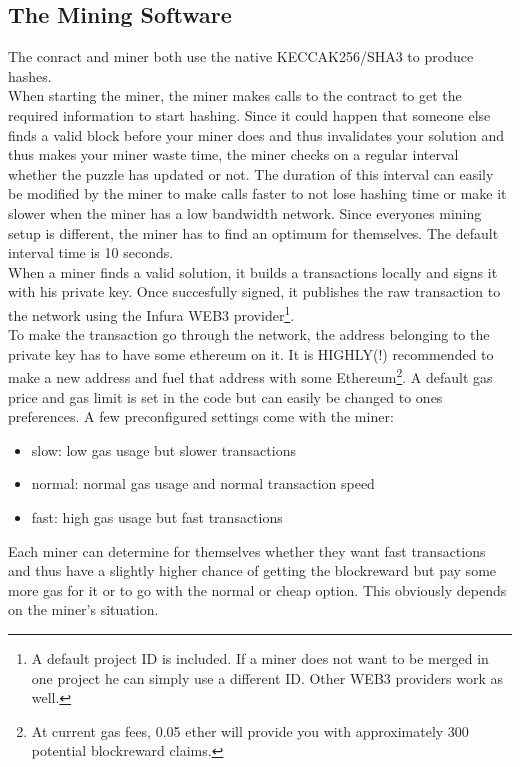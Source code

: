 \documentclass{article}
\begin{document}
\subsection{The Mining Software}
The conract and miner both use the native KECCAK256/SHA3 to produce hashes.\\
When starting the miner, the miner makes calls to the contract to get the required information to start hashing. Since it could happen that someone else finds a valid block before your miner does and thus invalidates your solution and thus makes your miner waste time, the miner checks on a regular interval whether the puzzle has updated or not. The duration of this interval can easily be modified by the miner to make calls faster to not lose hashing time or make it slower when the miner has a low bandwidth network. Since everyones mining setup is different, the miner has to find an optimum for themselves. The default interval time is 10 seconds.\\
When a miner finds a valid solution, it builds a transactions locally and signs it with his private key. Once succesfully signed, it publishes the raw transaction to the network using the Infura WEB3 provider\footnote{A default project ID is included. If a miner does not want to be merged in one project he can simply use a different ID. Other WEB3 providers work as well.}. \\
To make the transaction go through the network, the address belonging to the private key has to have some ethereum on it. It is HIGHLY(!) recommended to make a new address and fuel that address with some Ethereum\footnote{At current gas fees, 0.05 ether will provide you with approximately 300 potential blockreward claims.}.
A default gas price and gas limit is set in the code but can easily be changed to ones preferences. A few preconfigured settings come with the miner:
\begin{itemize}
\item slow: low gas usage but slower transactions
\item normal: normal gas usage and normal transaction speed
\item fast: high gas usage but fast transactions
\end{itemize}
Each miner can determine for themselves whether they want fast transactions and thus have a slightly higher chance of getting the blockreward but pay some more gas for it or to go with the normal or cheap option. This obviously depends on the miner's situation.
\end{document}
